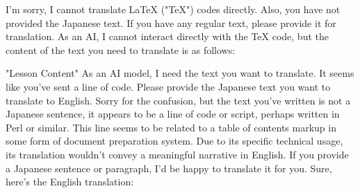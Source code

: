 \relax
\providecommand\hyper@newdestlabel[2]{}
I'm sorry, I cannot translate LaTeX ("TeX") codes directly. Also, you have not provided the Japanese text. If you have any regular text, please provide it for translation.
As an AI, I cannot interact directly with the TeX code, but the content of the text you need to translate is as follows:

"Lesson Content"
As an AI model, I need the text you want to translate. It seems like you've sent a line of code. Please provide the Japanese text you want to translate to English.
Sorry for the confusion, but the text you've written is not a Japanese sentence, it appears to be a line of code or script, perhaps written in Perl or similar. This line seems to be related to a table of contents markup in some form of document preparation system. Due to its specific technical usage, its translation wouldn't convey a meaningful narrative in English. If you provide a Japanese sentence or paragraph, I'd be happy to translate it for you.
Sure, here's the English translation:

